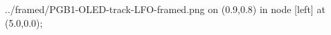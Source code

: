 \documentclass[preview]{standalone}
\begin{document}
\begin{zoomed}{../framed/PGB1-OLED-track-LFO-framed.png}
  \spy [gray, size=3.2cm] on (0.9,0.8) in node [left] at (5.0,0.0);
\end{zoomed}
\end{document}
